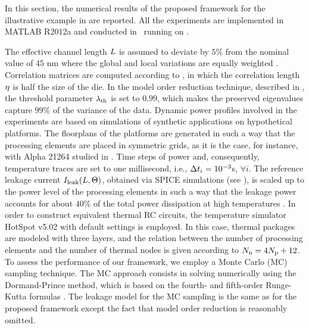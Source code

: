 In this section, the numerical results of the proposed framework for the illustrative example in  are reported. All the experiments are implemented in MATLAB R2012a \cite{matlab} and conducted in \hostOS\ running on \hostHardware.

The effective channel length $L$ is assumed to deviate by $5\%$ from the nominal value of $45$ nm where the global and local variations are equally weighted \cite{juan2011, juan2012}. Correlation matrices are computed according to , in which the correlation length $\eta$ is half the size of the die. In the model order reduction technique, described in , the threshold parameter $\lambda_\text{th}$ is set to $0.99$, which makes the preserved eigenvalues capture $99\%$ of the variance of the data. Dynamic power profiles involved in the experiments are based on simulations of synthetic applications on hypothetical platforms. The floorplans of the platforms are generated in such a way that the processing elements are placed in symmetric grids, as it is the case, for instance, with Alpha 21264 studied in \cite{juan2011}. Time steps of power and, consequently, temperature traces are set to one millisecond, i.e., $\Delta t_i = 10^{-3}$s, $\forall i$. The reference leakage current $I_{\text{leak}}(L, \Theta)$, obtained via SPICE simulations (see ), is scaled up to the power level of the processing elements in such a way that the leakage power accounts for about $40\%$ of the total power dissipation at high temperatures \cite{liu2007}. In order to construct equivalent thermal RC circuits, the temperature simulator HotSpot v5.02 \cite{hotspot} with default settings is employed. In this case, thermal packages are modeled with three layers, and the relation between the number of processing elements and the number of thermal nodes is given according to $N_\text{n} = 4 {N_\text{p}} + 12$. To assess the performance of our framework, we employ a Monte Carlo (MC) sampling technique. The MC approach consists in solving  numerically using the Dormand-Prince method, which is based on the fourth- and fifth-order Runge-Kutta formulas \cite{press2007}. The leakage model for the MC sampling is the same as for the proposed framework except the fact that model order reduction is reasonably omitted.

